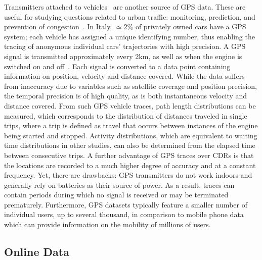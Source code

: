 Transmitters attached to vehicles~\cite{bazzani_2010_statistical, pappalardo_2013_understanding} are another source of GPS data. These are useful for studying questions related to urban traffic: monitoring, prediction, and prevention of congestion~\cite{pappalardo_2013_understanding}. In Italy, $\simeq 2\%$ of privately owned cars have a GPS system; each vehicle has assigned a unique identifying number, thus enabling the tracing of anonymous individual cars' trajectories with high precision. A GPS signal is transmitted approximately every 2km, as well as when the engine is switched on and off~\cite{bazzani_2010_statistical}. Each signal is converted to a data point containing information on position, velocity and distance covered. While the data suffers from inaccuracy due to variables such as satellite coverage and position precision, the temporal precision is of high quality, as is both instantaneous velocity and distance covered. From such GPS vehicle traces, path length distributions can be measured, which corresponds to the distribution of distances traveled in single trips, where a trip is defined as travel that occurs between instances of the engine being started and stopped. Activity distributions, which are equivalent to waiting time distributions in other studies, can also be determined from the elapsed time between consecutive trips. 
A further advantage of GPS traces over CDRs is that the locations are recorded to a much higher degree of accuracy and at a constant frequency. 
%
Yet, there are drawbacks: GPS transmitters do not work indoors and generally rely on batteries as their source of power. As a result, traces can contain periods during which no signal is received or may be terminated prematurely. Furthermore, GPS datasets typically feature a smaller number of individual users, up to several thousand, in comparison to mobile phone data which can provide information on the mobility of millions of users. 

\subsection{Online Data}
\label{sec:online}

